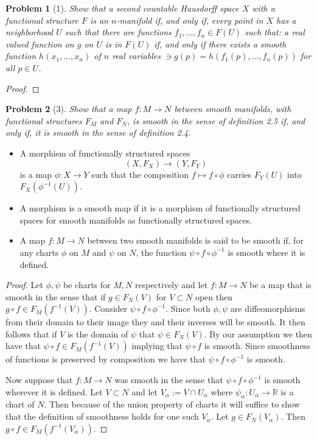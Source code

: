 \documentclass[10pt]{article}
\newcommand{\sk}{\vskip 10mm}
\newcommand{\bb}[1]{\mathbb{#1}}
\theoremstyle{plain}
\newtheorem{problem}{Problem}
\theoremstyle{remark}
\begin{document}
\begin{problem}[1]
  Show that a second countable Hausdorff space $X$ with a functional
  structure $F$ is an $n$-manifold if, and only if, every point in
  $X$ has a neighborhood $U$ such that there are functions
  $f_1,\ldots,f_n\in F(U)$ such that: a real valued function on $g$
  on $U$ is in $F(U)$ if, and only if there exists a smooth function
  $h(x_1,\ldots,x_n)$ of $n$ real variables $\ni g(p)=h(f_1(p),\ldots,f_n(p))$
  for all $p\in U$.
\end{problem}

\begin{proof}
  
\end{proof}

\sk

\begin{problem}[3]
  Show that a map $f:M\rightarrow N$ between smooth manifolds, with functional
  structures $F_M$ and $F_N$, is smooth in the sense of definition 2.5
  if, and only if, it is smooth in the sense of definition 2.4.
\end{problem}

\begin{itemize}
\item[2.3:] A morphism of functionally structured spaces
  \[ (X,F_X)\rightarrow (Y,F_Y) \]
  is a map $\phi:X\rightarrow Y$ such that the composition $f\mapsto f\circ\phi$ carries
  $F_Y(U)$ into $F_X(\phi^{-1}(U))$.
\item[2.4:] A morphism is a smooth map if it is a morphism of functionally
  structured spaces for smooth manifolds as functionally structured spaces.
\item[2.5:] A map $f:M\rightarrow N$ between two smooth manifolds is said to be
  smooth if, for any charts $\phi$ on $M$ and $\psi$ on $N$, the function
  $\psi\circ f\circ\phi^{-1}$ is smooth where it is defined.
\end{itemize}

\begin{proof}
  Let $\phi,\psi$ be charts for $M,N$ respectively and let $f:M\rightarrow N$ be a map that
  is smooth in the sense that if $g\in F_N(V)$ for $V\subset N$ open then
  $g\circ f\in F_M(f^{-1}(V))$. Consider $\psi\circ f\circ \phi^{-1}$. Since both $\phi,\psi$ are diffeomorphisms
  from their domain to their image they and their inverses will be smooth. It then
  follows that if $V$ is the domain of $\psi$ that $\psi\in F_N(V)$. By
  our assumption we then have that $\psi\circ f\in F_M(f^{-1}(V))$ implying that
  $\psi\circ f$ is smooth. Since smoothness of functions is preserved by composition
  we have that $\psi\circ f\circ\phi^{-1}$ is smooth.

  Now suppose that $f:M\rightarrow N$ was smooth in the sense that $\psi\circ f\circ \phi^{-1}$ is smooth
  wherever it is defined. Let $V\subset N$ and let $V_\alpha:=V\cap U_\alpha$ where $\psi_\alpha:U_\alpha\rightarrow\bb{R}$
  is a chart of $N$. Then because of the union property of charts it will suffice
  to show that the definition of smoothness holds for one such $V_\alpha$. Let
  $g\in F_N(V_\alpha)$. Then $g\circ f\in F_M(f^{-1}(V_\alpha))$.
\end{proof}
\end{document}
